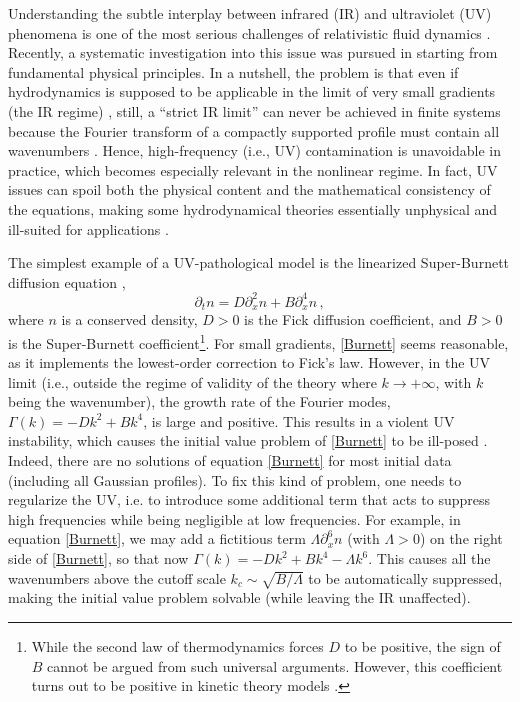 \documentclass[a4paper, amsfonts, amssymb, amsmath, reprint, showkeys, nofootinbib, twoside,notitlepage,onecolumn,preprintnumbers]{revtex4-2}
\theoremstyle{definition}
\theoremstyle{theorem}
\theoremstyle{corollary}
\begin{document}
Understanding the subtle interplay between infrared (IR) and ultraviolet (UV) phenomena is one of the most serious challenges of relativistic fluid dynamics \cite{Kost2000,GavassinoFronntiers2021,GavassinoSuperluminal2021}. Recently, a systematic investigation into this issue was pursued in \cite{Bemfica2017TheFirst,BemficaDNDefinitivo2020,GavassinoGibbs2021,GavassinoUniversality2023} starting from fundamental physical principles. In a nutshell, the problem is that even if hydrodynamics is supposed to be applicable in the limit of very small gradients (the IR regime) \cite{Baier:2007ix,Romatschke:2017ejr,Kovtun2019}, still, a ``strict IR limit'' can never be achieved in finite systems because the Fourier transform of a compactly supported profile must contain all wavenumbers \cite{Hormander_book}. Hence, high-frequency (i.e., UV) contamination is unavoidable in practice, which becomes especially relevant in the nonlinear regime. In fact, UV issues can spoil both the physical content and the mathematical consistency of the equations, making some hydrodynamical theories essentially unphysical and ill-suited for applications \cite{Hiscock_Insatibility_first_order,Speranza2021,OlsonRegular1990,Bobylev1982}. 

The simplest example of a UV-pathological model is the linearized Super-Burnett diffusion equation \cite{Bobylev1982,SHAVALIYEV1993,Chernov2000,Struchup2005},
\begin{equation}\label{Burnett}
    \partial_t n = D \partial^2_x n +B \partial^4_x n\, ,
\end{equation}
where $n$ is a conserved density, $D{>}0$ is the Fick diffusion coefficient, and $B{>}0$ is the Super-Burnett coefficient\footnote{While the second law of thermodynamics forces $D$ to be positive, the sign of $B$ cannot be argued from such universal arguments. However, this coefficient turns out to be positive in kinetic theory models \cite{Struchup2005}.}. For small gradients, \eqref{Burnett} seems reasonable, as it implements the lowest-order correction to Fick's law. However, in the UV limit (i.e., outside the regime of validity of the theory where $k{\rightarrow} {+}\infty$, with $k$ being the wavenumber), the growth rate of the Fourier modes, $\Gamma(k){=}{-}Dk^2{+}Bk^4$, is large and positive. This results in a violent UV instability, which causes the initial value problem of \eqref{Burnett} to be ill-posed \cite{Bobylev1982}. Indeed, there are no solutions of equation \eqref{Burnett} for most initial data (including all Gaussian profiles).
To fix this kind of problem, one needs to regularize the UV, i.e. to introduce some additional term that acts to suppress high frequencies while being negligible at low frequencies. For example, in equation \eqref{Burnett}, we may add a fictitious term $\Lambda\partial^6_x n$ (with $\Lambda{>}0$) on the right side of \eqref{Burnett}, so that now $\Gamma(k){=}{-}Dk^2{+}Bk^4{-}\Lambda k^6$. This causes all the wavenumbers above the cutoff scale $k_c {\sim} \sqrt{B/\Lambda}$ to be automatically suppressed, making the initial value problem solvable (while leaving the IR unaffected).
\end{document}
